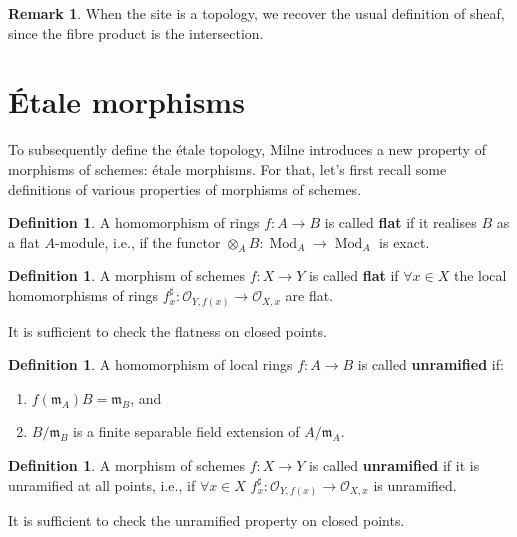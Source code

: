 \documentclass{report}
\DeclareMathOperator{\Mod}{Mod}
\theoremstyle{definition}
\newtheorem{definition}[equation]{Definition}
\newtheorem{remark}[equation]{Remark}
\begin{document}
\begin{remark}
When the site is a topology, we recover the usual definition of sheaf, since the fibre product is the intersection.
\end{remark}

\section{\'{E}tale morphisms}

To subsequently define the \'{e}tale topology, Milne \cite[Section~I.2]{milne2013lectures} introduces a new property of morphisms of schemes: \'{e}tale morphisms. For that, let's first recall some definitions of various properties of morphisms of schemes.

\begin{definition}
A homomorphism of rings $f:A\rightarrow B$ is called \textbf{flat} if it realises $B$ as a flat $A$-module, i.e., if the functor $\otimes_AB:\Mod_A\rightarrow\Mod_A$ is exact.
\end{definition}

\begin{definition}
A morphism of schemes $f:X\rightarrow Y$ is called \textbf{flat} if $\forall x\in X$ the local homomorphisms of rings $f_x^{\sharp}:\mathcal{O}_{Y,f(x)}\rightarrow\mathcal{O}_{X,x}$ are flat.

It is sufficient to check the flatness on closed points.
\end{definition}

\begin{definition}
A homomorphism of local rings $f:A\rightarrow B$ is called \textbf{unramified} if:
\begin{enumerate}
\item $f(\mathfrak{m}_A)B=\mathfrak{m}_B$, and
\item $B/\mathfrak{m}_B$ is a finite separable field extension of $A/\mathfrak{m}_A$.
\end{enumerate}
\end{definition}

\begin{definition}
A morphism of schemes $f:X\rightarrow Y$ is called \textbf{unramified} if it is unramified at all points, i.e., if $\forall x\in X$ $f_x^{\sharp}:\mathcal{O}_{Y,f(x)}\rightarrow\mathcal{O}_{X,x}$ is unramified.

It is sufficient to check the unramified property on closed points.
\end{definition}
\end{document}
